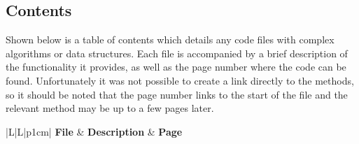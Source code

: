 \documentclass{article}
\begin{document}
\subsection{Contents}

Shown below is a table of contents which details any code files with complex algorithms or data structures. Each file is accompanied by a brief description of the functionality it provides, as well as the page number where the code can be found. Unfortunately it was not possible to create a link directly to the methods, so it should be noted that the page number links to the start of the file and the relevant method may be up to a few pages later.

\begin{table}[H]
    \centering
        \begin{tabularx}{\textwidth}{|L|L|p{1cm}|}
        \hline
        \textbf{File} & \textbf{Description} & \textbf{Page} \\\hline


\end{tabularx}
\end{table}
\end{document}
